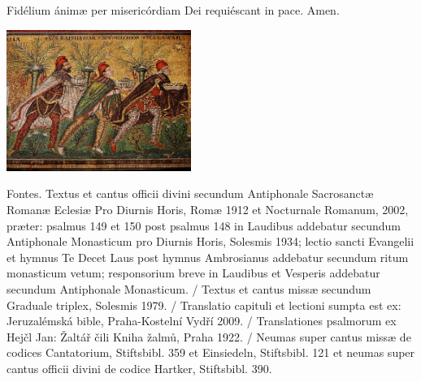 \documentclass[a4paper, twoside, 12pt]{article}
\begin{document}
\vfill
\pagebreak


\trOrationis

\vfill


\vfill

\noindent \Vbardot{} Fidélium ánimæ per misericórdiam Dei requiéscant in pace.
\Rbardot{} Amen.

\trFideliumAnimae

\vfill

\newpage
\RemoveSideThumbs
\pagestyle{empty}



\vfill

\newpage

\begin{center}
\includegraphics[width=6cm]{imagines/ravenna.jpg}
\end{center}

\vfill

Fontes.
Textus et cantus officii divini secundum
Antiphonale Sacrosanctæ Romanæ Eclesiæ Pro Diurnis Horis, Romæ 1912
et Nocturnale Romanum, 2002, præter: psalmus 149 et 150 post
psalmus 148 in Laudibus addebatur secundum Antiphonale Monasticum pro Diurnis Horis,
Solesmis 1934; lectio sancti Evangelii et hymnus Te Decet Laus post hymnus
Ambrosianus addebatur secundum ritum monasticum vetum; responsorium breve
in Laudibus et Vesperis addebatur secundum Antiphonale Monasticum. /
Textus et cantus missæ secundum
Graduale triplex, Solesmis 1979. /
Translatio capituli et lectioni sumpta est ex:
Jeruzalémská bible, Praha-Kostelní Vydří 2009. /
Translationes psalmorum ex
Hejčl Jan: Žaltář čili Kniha žalmů, Praha 1922. /
Neumas super cantus missæ de codices Cantatorium, Stiftsbibl. 359 et Einsiedeln,
Stiftsbibl. 121 et neumas super cantus officii divini de codice Hartker,
Stiftsbibl. 390.
\end{document}
